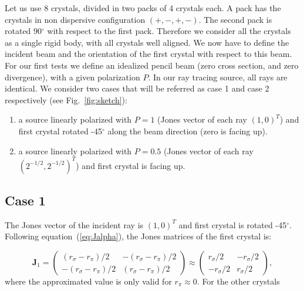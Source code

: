 \documentclass{iucr}
\begin{document}
Let us use 8 crystals, divided in two packs of 4 crystals each. A pack has the crystals in non dispersive configuration $(+,-,+,-)$. The second pack is rotated 90$^\circ$ with respect to the first pack. Therefore we consider all the crystals as a single rigid body, with all crystals well aligned. We now have to define the incident beam and the orientation of the first crystal with respect to this beam. For our first tests we define an idealized pencil beam (zero cross section, and zero divergence), with a given polarization $P$. In our ray tracing source, all rays are identical. We consider two cases that will be referred as case 1 and case 2 respectively (see Fig.~\ref{fig:sketch}):
\begin{enumerate}
    \item a source linearly polarized with $P=1$ (Jones vector of each ray $(1,0)^T$) and first crystal rotated -45$^\circ$ along the beam direction (zero is facing up).
    \item a source linearly polarized with $P=0.5$ (Jones vector of each ray $(2^{-1/2},2^{-1/2})^T$) and first crystal is facing up.    
\end{enumerate}

\subsection{Case 1}
The Jones vector of the incident ray is $(1,0)^T$ and first crystal is rotated -45$^\circ$. Following equation~(\ref{eq:Jalpha}), the Jones matrices of the first crystal is: 

\begin{equation}\label{eq:Jcase1_xtal1}
    \textbf{J}_1=
    \begin{pmatrix}
(r_\sigma - r_\pi) / 2 & -(r_\sigma - r_\pi) / 2\\
-(r_\sigma - r_\pi) / 2& 
(r_\sigma - r_\pi) / 2
\end{pmatrix}
\approx
    \begin{pmatrix}
r_\sigma  / 2 & -r_\sigma  / 2\\
-r_\sigma / 2& 
r_\sigma  / 2
\end{pmatrix}
,
\end{equation}
where the approximated value is only valid for $r_\pi \approx 0$. For the other crystals
\end{document}

